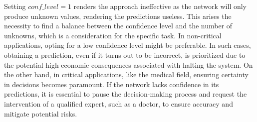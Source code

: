Setting $conf \_ level = 1$ renders the approach ineffective as the network will only produce unknown values, rendering the predictions useless. This arises the necessity to find a balance between the confidence level and the number of unknowns, which is a consideration for the specific task. In non-critical applications, opting for a low confidence level might be preferable. In such cases, obtaining a prediction, even if it turns out to be incorrect, is prioritized due to the potential high economic consequences associated with halting the system. On the other hand, in critical applications, like the medical field, ensuring certainty in decisions becomes paramount. If the network lacks confidence in its predictions, it is essential to pause the decision-making process and request the intervention of a qualified expert, such as a doctor, to ensure accuracy and mitigate potential risks.
